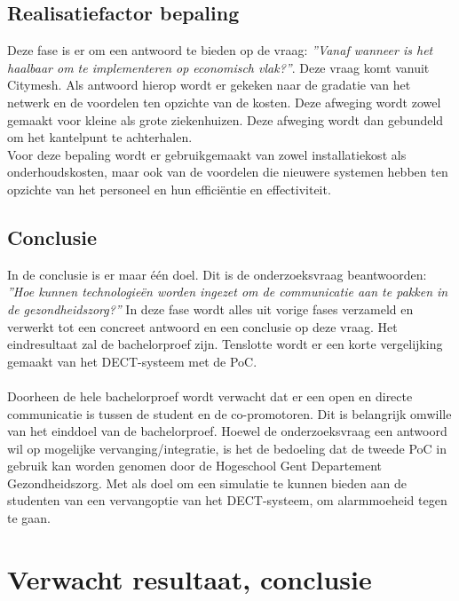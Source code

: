 \subsection{Realisatiefactor bepaling}
Deze fase is er om een antwoord te bieden op de vraag: \textit{''Vanaf wanneer is het haalbaar om te implementeren op economisch vlak?''}. Deze vraag komt vanuit Citymesh. Als antwoord hierop wordt er gekeken naar de gradatie van het netwerk en de voordelen ten opzichte van de kosten. Deze afweging wordt zowel gemaakt voor kleine als grote ziekenhuizen. Deze afweging wordt dan gebundeld om het kantelpunt te achterhalen. \\ Voor deze bepaling wordt er gebruikgemaakt van zowel installatiekost als onderhoudskosten, maar ook van de voordelen die nieuwere systemen hebben ten opzichte van het personeel en hun efficiëntie en effectiviteit. 


\subsection{Conclusie}
In de conclusie is er maar één doel. Dit is de onderzoeksvraag beantwoorden: \textit{''Hoe kunnen technologieën worden ingezet om de communicatie aan te pakken in de gezondheidszorg?''} In deze fase wordt alles uit vorige fases verzameld en verwerkt tot een concreet antwoord en een conclusie op deze vraag. Het eindresultaat zal de bachelorproef zijn. Tenslotte wordt er een korte vergelijking gemaakt van het DECT-systeem met de PoC.
\\\\
Doorheen de hele bachelorproef wordt verwacht dat er een open en directe communicatie is tussen de student en de co-promotoren. Dit is belangrijk omwille van het einddoel van de bachelorproef. Hoewel de onderzoeksvraag een antwoord wil op mogelijke vervanging/integratie, is het de bedoeling dat de tweede PoC in gebruik kan worden genomen door de Hogeschool Gent Departement Gezondheidszorg. Met als doel om een simulatie te kunnen bieden aan de studenten van een vervangoptie van het DECT-systeem, om alarmmoeheid tegen te gaan.


\section{Verwacht resultaat, conclusie}%
\label{sec:verwachte_resultaten}

